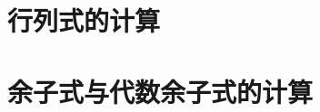 \documentclass[8pt a4paper, oneside, UTF8]{ctexbook}
\begin{document}
\begin{sloppypar}
    \section{行列式的计算}
    
    \section{余子式与代数余子式的计算}

        \ifx\allfiles\undefined
    \end{sloppypar}
\end{document}
